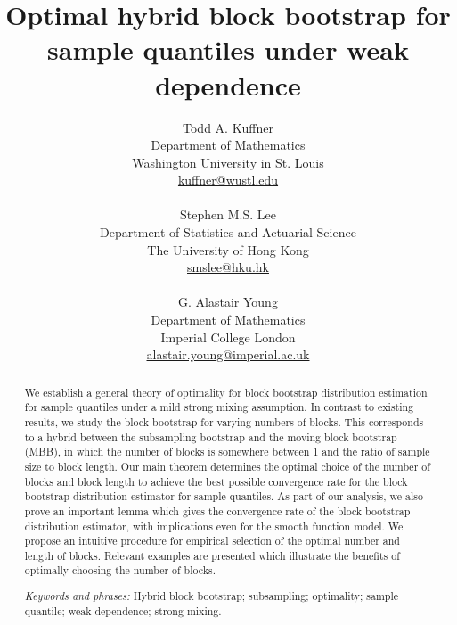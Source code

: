 \documentclass[a4paper, 12pt]{article}
\theoremstyle{plain}
\theoremstyle{definition}
\begin{document}
\title{Optimal hybrid block bootstrap for sample quantiles under weak dependence}

\author{
Todd A. Kuffner \\
Department of Mathematics \\
Washington University in St. Louis \\
\url{kuffner@wustl.edu} \\
\mbox{} \\
Stephen M.S. Lee \\
Department of Statistics and Actuarial Science \\
The University of Hong Kong \\
\url{smslee@hku.hk} \\
\mbox{} \\
G. Alastair Young \\
Department of Mathematics \\
Imperial College London \\
\url{alastair.young@imperial.ac.uk}
}

\maketitle

\begin{abstract}
We establish a general theory of optimality for block bootstrap distribution estimation for sample quantiles under a mild strong mixing assumption. In contrast to existing results, we study the block bootstrap for varying numbers of blocks. This corresponds to a hybrid between the subsampling bootstrap and the moving block bootstrap (MBB), in which the number of blocks is somewhere between 1 and the ratio of sample size to block length. Our main theorem determines the optimal choice of the number of blocks and block length to achieve the best possible convergence rate for the block bootstrap distribution estimator for sample quantiles. As part of our analysis, we also prove an important lemma which gives the convergence rate of the block bootstrap distribution estimator, with implications even for the smooth function model. We propose an intuitive procedure for empirical selection of the optimal number and length of blocks. Relevant examples are presented which illustrate the benefits of optimally choosing the number of blocks.

\medskip

\emph{Keywords and phrases:} Hybrid block bootstrap; subsampling; optimality; sample quantile; weak dependence; strong mixing.
\end{abstract}
\end{document}
